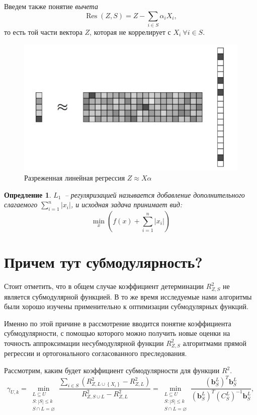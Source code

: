 \documentclass[preprint,12pt]{elsarticle}
\newtheorem{definition}{Опредление}
\begin{document}
Введем также понятие \textit{вычета}
\[\operatorname{Res}(Z, S)=Z-\sum\limits_{i \in S} \alpha_{i} X_{i},\]
то есть той части вектора $Z$, которая не коррелирует с $X_i~\forall i\in S$.

\begin{figure}[h]
\centering\includegraphics[width=0.6\linewidth]{Screenshot_1.png}
\caption{Разреженная линейная регрессия $Z\approx X\alpha$}
\end{figure}

\begin{definition}
$L_1$~-- регуляризацией называется добавление дополнительного слагаемого $\sum\limits_{i = 1}^n |x_i|$, и исходная задача принимает вид: 
\[
\min\limits_{x}(f(x) + \sum\limits_{i = 1}^n|x_i|)
\]
\end{definition}

\section{Причем тут субмодулярность?}

Стоит отметить, что в общем случае коэффициент детерминации $R^2_{Z, S}$ не является субмодулярной функцией. В то же время исследуемые нами алгоритмы были хорошо изучены применительно к оптимизации субмодулярных функций. 

Именно по этой причине в рассмотрение вводится понятие коэффициента субмодулярности, с помощью которого можно получить новые оценки на точность аппроксимации несубмодулярной функции $R^2_{Z, S}$ алгоритмами прямой регрессии и ортогонального согласованного преследования.

Рассмотрим, каким будет коэффициент субмодулярности для функции $R^2$.
\[\gamma_{U, k}=\min_{\substack{L \subseteq U\\ S:|S| \leq k \\ S \cap L=\varnothing}} \frac{\sum_{i \in S}\left(R_{Z, L \cup\left\{X_{i}\right\}}^{2}-R_{Z, L}^{2}\right)}{R_{Z, S \cup L}^{2}-R_{Z, L}^{2}}=\min_{\substack{L \subseteq U\\ S:|S| \leq k \\ S \cap L=\varnothing}} \frac{\left(\mathbf{b}_{S}^{L}\right)^{T} \mathbf{b}_{S}^{L}}{\left(\mathbf{b}_{S}^{L}\right)^{T}\left(C_{S}^{L}\right)^{-1} \mathbf{b}_{S}^{L}},\]
\end{document}
